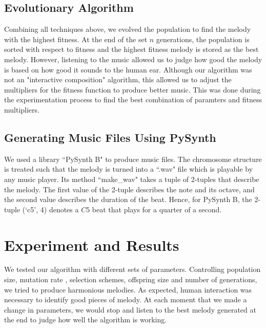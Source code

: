 \documentclass[conference]{IEEEtran}
\begin{document}
\subsection{Evolutionary Algorithm}
Combining all techniques above, we evolved the population to find the melody with the highest fitness. At the end of the set $n$ generations, the population is sorted with respect to fitness and the highest fitness melody is stored as the best melody. However, listening to the music allowed us to judge how good the melody is based on how good it sounds to the human ear. Although our algorithm was not an "interactive composition" algorithm, this allowed us to adjust the multipliers for the fitness function to produce better music. This was done during the experimentation process to find the best combination of paramters and fitness multipliers.

\subsection{Generating Music Files Using PySynth}
We used a library ``PySynth B" to produce music files. The chromosome structure is treated such that the melody is turned into a ``.wav" file which is playable by any music player. Its method ``make\_wav" takes a tuple of 2-tuples that describe the melody. The first value of the 2-tuple describes the note and its octave, and the second value describes the duration of the beat. Hence, for PySynth B, the 2-tuple (`c5', 4) denotes a $C5$ beat that plays for a quarter of a second.


\section{Experiment and Results}
We tested our algorithm with different sets of parameters. Controlling population size, mutation rate , selection schemes, offspring size and number of generations, we tried to produce harmonious melodies. As expected, human interaction was necessary to identify good pieces of melody. At each moment that we made a change in parameters, we would stop and listen to the best melody generated at the end to judge how well the algorithm is working.
\end{document}
